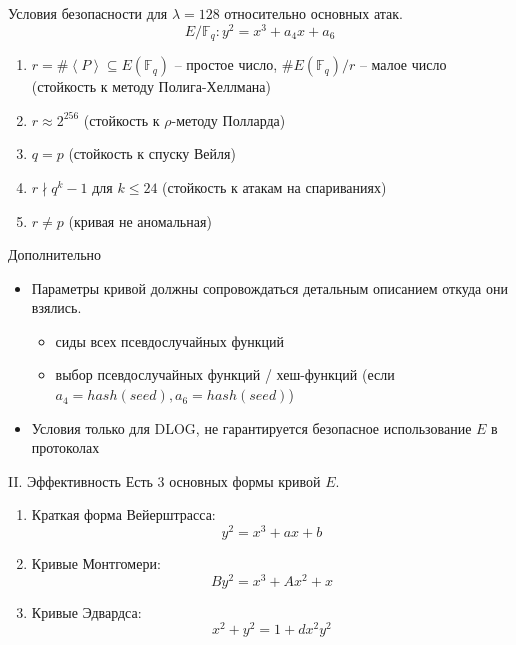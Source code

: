 \documentclass{beamer}
\begin{document}
\begin{frame}{Условия безопасности для $\lambda = 128$ относительно основных атак.}
    \[E/\mathbb{F}_q: y^2 = x^3 + a_4 x + a_6\]
    \begin{enumerate}
        \item $r = \#\left<P\right> \subseteq E(\mathbb{F}_q)$ -- простое число, $\#E(\mathbb{F}_q) / r$ -- малое число (стойкость к методу Полига-Хеллмана)
        \item $r \approx 2^{256}$ (стойкость к $\rho$-методу Полларда) 
        \item $q = p$ (стойкость к спуску Вейля)
        \item $r \nmid q^k - 1$ для $k \leq 24$ (стойкость к атакам на спариваниях)
        \item $r \neq p$ (кривая не аномальная)
    \end{enumerate}
\end{frame}

\begin{frame}{Дополнительно}
    \begin{itemize}
        \item Параметры кривой должны сопровождаться детальным описанием откуда они взялись.
        \begin{itemize}
            \item сиды всех псевдослучайных функций
            \item выбор псевдослучайных функций / хеш-функций (если $a_4 = hash(seed), a_6 = hash(seed)$)
        \end{itemize}
        \item Условия только для DLOG, не гарантируется безопасное использование $E$ в протоколах
    \end{itemize}
\end{frame}


\begin{frame}{II. Эффективность}
Есть $3$ основных формы кривой $E$.
\begin{enumerate}
    \item Краткая форма Вейерштрасса:
    \[y^2 = x^3 + a x + b\]
    \item Кривые Монтгомери:
    \[
    B y^2 = x^3 + A x^2 + x
    \]
    \item Кривые Эдвардса:
    \[
    x^2 + y^2 = 1 + d x^2 y^2
    \]
\end{enumerate}
\end{frame}
\end{document}
